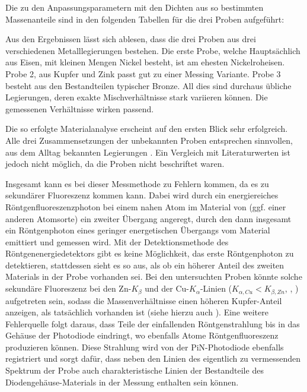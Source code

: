 Die zu den Anpassungsparametern mit den Dichten aus \cite[735-792]{crc} so bestimmten Massenanteile sind in den folgenden Tabellen für die drei Proben aufgeführt:



Aus den Ergebnissen lässt sich ablesen, dass die drei Proben aus drei verschiedenen Metalllegierungen bestehen. Die erste Probe, welche Hauptsächlich aus Eisen, mit kleinen Mengen Nickel besteht, ist am ehesten Nickelroheisen. Probe 2, aus Kupfer und Zink passt gut zu einer Messing Variante. Probe 3 besteht aus den Bestandteilen typischer Bronze. All dies sind durchaus übliche Legierungen, deren exakte Mischverhältnisse stark variieren können. Die gemessenen Verhältnisse wirken passend. 


Die so erfolgte Materialanalyse erscheint auf den ersten Blick sehr erfolgreich. Alle drei Zusammensetzungen der unbekannten Proben entsprechen sinnvollen, aus dem Alltag bekannten Legierungen . Ein Vergleich mit Literaturwerten ist jedoch nicht möglich, da die Proben nicht beschriftet waren.

Insgesamt kann es bei dieser Messmethode zu Fehlern kommen, da es zu sekundärer Fluoreszenz kommen kann. Dabei wird durch ein energiereiches Röntgenfluoreszenzphoton bei einem nahen Atom im Material von (ggf. einer anderen Atomsorte) ein zweiter Übergang angeregt, durch den dann insgesamt ein Röntgenphoton eines geringer energetischen Übergangs vom Material emittiert und gemessen wird. Mit der Detektionsmethode des Röntgenenergiedetektors gibt es keine Möglichkeit, das erste Röntgenphoton zu detektieren, stattdessen sieht es so aus, als ob ein höherer Anteil des zweiten Materials in der Probe vorhanden sei. Bei den untersuchten Proben könnte solche sekundäre Fluoreszenz bei den Zn-$K_\beta$ und der Cu-$K_\alpha$-Linien ($K_{\alpha, Cu}< K_{\beta,Zn}$, \cite{LDfluoreszenz}, \cite{NISTxray}) aufgetreten sein, sodass die Massenverhältnisse einen höheren Kupfer-Anteil anzeigen, als tatsächlich vorhanden ist (siehe hierzu auch \cite{LDfluoreszenz}). Eine weitere Fehlerquelle folgt daraus, dass Teile der einfallenden Röntgenstrahlung bis in das Gehäuse der Photodiode eindringt, wo ebenfalls Atome Röntgenfluoreszenz produzieren können. Diese Strahlung wird von der PiN-Photodiode ebenfalls registriert und sorgt dafür, dass neben den Linien des eigentlich zu vermessenden Spektrum der Probe auch charakteristische Linien der Bestandteile des Diodengehäuse-Materials in der Messung enthalten sein können.
